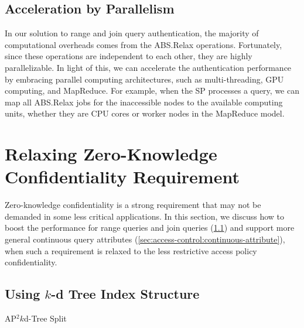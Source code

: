 \subsection{Acceleration by Parallelism}
In our solution to range and join query authentication, the majority of computational overheads comes from the \textsf{ABS.Relax} operations. Fortunately, since these operations are independent to each other, they are highly parallelizable. In light of this, we can accelerate the authentication performance by embracing parallel computing architectures, such as multi-threading, GPU computing, and MapReduce. For example, when the SP processes a query, we can map all \textsf{ABS.Relax} jobs for the inaccessible nodes to the available computing units, whether they are CPU cores or worker nodes in the MapReduce model.

\section{Relaxing Zero-Knowledge Confidentiality Requirement}\label{sec:access-control:relaxing-zero-knowledge}

Zero-knowledge confidentiality is a strong requirement that may not be demanded in some less critical applications. In this section, we discuss how to boost the performance for range queries and join queries (\cref{sec:access-control:kd-tree}) and support more general continuous query attributes (\cref{sec:access-control:continuous-attribute}), when such a requirement is relaxed to the less restrictive access policy confidentiality.

\subsection{Using \texorpdfstring{$k$}{k}-d Tree Index Structure}\label{sec:access-control:kd-tree}

\begin{algorithm}[t]
    \caption{AP$^2k$d-Tree Split}\label{alg:access-control:kd-split}
\end{algorithm}

